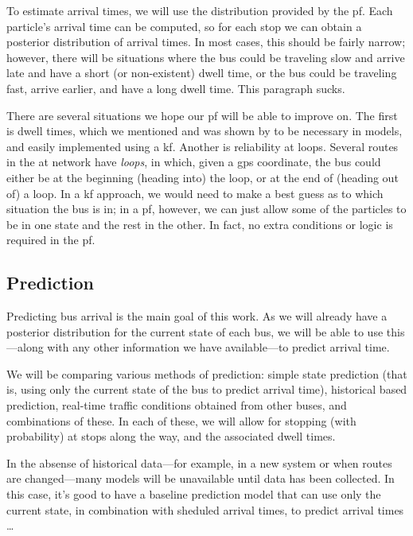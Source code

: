 \documentclass[12pt,a4paper]{article}
\begin{document}
To estimate arrival times, we will use the distribution provided by the \gls{pf}.
Each particle's arrival time can be computed, so for each stop we can obtain 
a posterior distribution of arrival times.
In most cases, this should be fairly narrow;
however, there will be situations where the bus could be traveling slow and arrive
late and have a short (or non-existent) dwell time,
or the bus could be traveling fast, arrive earlier,
and have a long dwell time.
This paragraph sucks.


There are several situations we hope our \gls{pf} will be able to improve on.
The first is dwell times, which we mentioned and was shown by 
\cite{hans-etal:2015} to be necessary in models, and easily implemented
using a \gls{kf}.
Another is reliability at loops.
Several routes in the \gls{at} network have \emph{loops},
in which, given a \gls{gps} coordinate, the bus could either be
at the beginning (heading into) the loop, or at the end of (heading out of) a loop.
In a \gls{kf} approach, we would need to make a best guess as to which situation 
the bus is in; 
in a \gls{pf}, however, we can just allow some of the particles to be in one state
and the rest in the other.
In fact, no extra conditions or logic is required in the \gls{pf}.





\subsection{Prediction}
\label{sec:new-prediction}


Predicting bus arrival is the main goal of this work.
As we will already have a posterior distribution for the current state of
each bus, 
we will be able to use this---along with any other information we
have available---to predict arrival time.


We will be comparing various methods of prediction:
simple state prediction (that is, using only the current state of the 
bus to predict arrival time),
historical based prediction,
real-time traffic conditions obtained from other buses,
and combinations of these.
In each of these, we will allow for stopping (with probability) at stops
along the way, and the associated dwell times.


In the absense of historical data---for example, in a new system or when
routes are changed---many models will be unavailable until data has been collected.
In this case, it's good to have a baseline prediction model that can use 
only the current state, in combination with sheduled arrival times,
to predict arrival times \ldots
\end{document}

